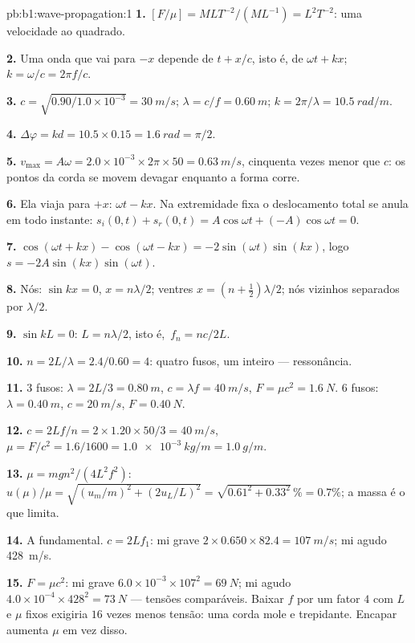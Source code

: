 \begin{solution}{pb:b1:wave-propagation:1}
\textbf{1.} $[F/\mu] = M L T^{-2}/(M L^{-1}) = L^2 T^{-2}$: uma velocidade
ao quadrado.

\textbf{2.} Uma onda que vai para $-x$ depende de $t + x/c$, isto é, de
$\omega t + kx$; $k = \omega/c = 2\pi f/c$.

\textbf{3.} $c = \sqrt{0.90/1.0\times10^{-3}} = \qty{30}{m/s}$;
$\lambda = c/f = \qty{0.60}{m}$; $k = 2\pi/\lambda = \qty{10.5}{rad/m}$.

\textbf{4.} $\Delta\varphi = kd = 10.5 \times 0.15 = \qty{1.6}{rad} = \pi/2$.

\textbf{5.} $v_{\max} = A\omega = 2.0\times10^{-3} \times 2\pi \times 50 =
\qty{0.63}{m/s}$, cinquenta vezes menor que $c$: os pontos da corda se movem
devagar enquanto a forma corre.

\textbf{6.} Ela viaja para $+x$:  $\omega t - kx$. Na extremidade
fixa o deslocamento total se anula em todo instante: $s_i(0, t) + s_r(0, t)
= A\cos\omega t + (-A)\cos\omega t = 0$.

\textbf{7.} $\cos(\omega t + kx) - \cos(\omega t - kx) =
-2\sin(\omega t)\sin(kx)$, logo $s = -2A\sin(kx)\sin(\omega t)$.

\textbf{8.} Nós: $\sin kx = 0$, $x = n\lambda/2$; ventres $x = (n +
\tfrac12)\lambda/2$; nós vizinhos separados por $\lambda/2$.

\textbf{9.} $\sin kL = 0$: $L = n\lambda/2$, isto é,\ $f_n = nc/2L$.

\textbf{10.} $n = 2L/\lambda = 2.4/0.60 = 4$: quatro fusos, um inteiro
--- ressonância.

\textbf{11.} $3$ fusos: $\lambda = 2L/3 = \qty{0.80}{m}$, $c = \lambda f
= \qty{40}{m/s}$, $F = \mu c^2 = \qty{1.6}{N}$. $6$ fusos: $\lambda =
\qty{0.40}{m}$, $c = \qty{20}{m/s}$, $F = \qty{0.40}{N}$.

\textbf{12.} $c = 2Lf/n = 2 \times 1.20 \times 50/3 = \qty{40}{m/s}$,
$\mu = F/c^2 = 1.6/1600 = \qty{1.0e-3}{kg/m} = \qty{1.0}{g/m}$.

\textbf{13.} $\mu = mgn^2/(4L^2f^2)$: $u(\mu)/\mu = \sqrt{(u_m/m)^2 +
(2u_L/L)^2} = \sqrt{0.61^2 + 0.33^2}\,\% = 0.7\%$; a massa é o que limita.

\textbf{14.} A fundamental. $c = 2Lf_1$: mi grave $2 \times 0.650 \times
82.4 = \qty{107}{m/s}$; mi agudo \qty{428}{m/s}.

\textbf{15.} $F = \mu c^2$: mi grave $6.0\times10^{-3} \times 107^2 =
\qty{69}{N}$; mi agudo $4.0\times10^{-4} \times 428^2 = \qty{73}{N}$ ---
tensões comparáveis. Baixar $f$ por um fator $4$ com $L$ e $\mu$ fixos
exigiria $16$ vezes menos tensão: uma corda mole e trepidante. Encapar
aumenta $\mu$ em vez disso.


\end{solution}
